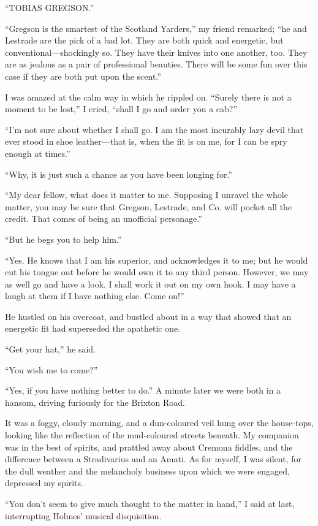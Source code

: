 \documentclass[12pt]{book}
\begin{document}
“TOBIAS GREGSON.” 

“Gregson is the smartest of the Scotland Yarders,” my friend remarked; “he and Lestrade are the pick of a bad lot. They are both quick and energetic, but conventional—shockingly so. They have their knives into one another, too. They are as jealous as a pair of professional beauties. There will be some fun over this case if they are both put upon the scent.” 

I was amazed at the calm way in which he rippled on. “Surely there is not a moment to be lost,” I cried, “shall I go and order you a cab?” 

“I’m not sure about whether I shall go. I am the most incurably lazy devil that ever stood in shoe leather—that is, when the fit is on me, for I can be spry enough at times.” 

“Why, it is just such a chance as you have been longing for.” 

“My dear fellow, what does it matter to me. Supposing I unravel the whole matter, you may be sure that Gregson, Lestrade, and Co. will pocket all the credit. That comes of being an unofficial personage.” 

“But he begs you to help him.” 

“Yes. He knows that I am his superior, and acknowledges it to me; but he would cut his tongue out before he would own it to any third person. However, we may as well go and have a look. I shall work it out on my own hook. I may have a laugh at them if I have nothing else. Come on!” 

He hustled on his overcoat, and bustled about in a way that showed that an energetic fit had superseded the apathetic one. 

“Get your hat,” he said. 

“You wish me to come?” 

“Yes, if you have nothing better to do.” A minute later we were both in a hansom, driving furiously for the Brixton Road. 

It was a foggy, cloudy morning, and a dun-coloured veil hung over the house-tops, looking like the reflection of the mud-coloured streets beneath. My companion was in the best of spirits, and prattled away about Cremona fiddles, and the difference between a Stradivarius and an Amati. As for myself, I was silent, for the dull weather and the melancholy business upon which we were engaged, depressed my spirits. 

“You don’t seem to give much thought to the matter in hand,” I said at last, interrupting Holmes’ musical disquisition. 
\end{document}
